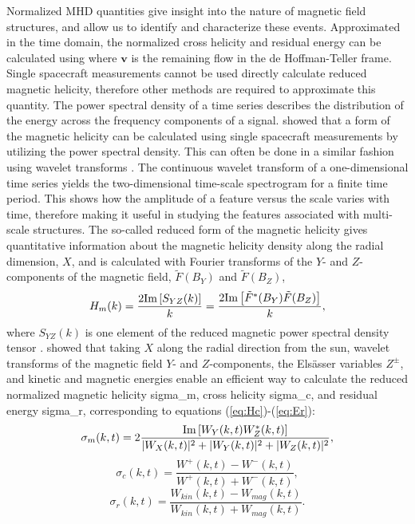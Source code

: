 Normalized MHD quantities give insight into the nature of magnetic field structures, and allow us to identify and characterize these events. Approximated in the time domain, the normalized cross helicity and residual energy can be calculated using
where $\mathbf{v}$ is the remaining flow in the de Hoffman-Teller frame. Single spacecraft measurements cannot be used directly calculate reduced magnetic helicity, therefore other methods are required to approximate this quantity. The power spectral density of a time series describes the distribution of the energy across the frequency components of a signal. \cite{Matthaeus:1982} showed that a form of the magnetic helicity can be calculated using single spacecraft measurements by utilizing the power spectral density. This can often be done in a similar fashion using wavelet transforms \citep{Telloni:2012, Telloni:2013}. The continuous wavelet transform of a one-dimensional time series yields the two-dimensional time-scale spectrogram for a finite time period. This shows how the amplitude of a feature versus the scale varies with time, therefore making it useful in studying the features associated with multi-scale structures. The so-called reduced form of the magnetic helicity gives quantitative information about the magnetic helicity density along the radial dimension, $X$, and is calculated with Fourier transforms of the $Y$- and $Z$-components of the magnetic field, $\tilde F(B_Y)$ and $\tilde F(B_Z)$,
\begin{equation}
    H_m(k) = \frac{2 \textnormal{Im}\left[S_{YZ} (k)\right]}{k} = \frac{2 \textnormal{Im}\left[ \tilde F^*(B_Y)\tilde F(B_Z) \right]}{k},
\end{equation}
where $S_{YZ}(k)$ is one element of the reduced magnetic power spectral density tensor \citep{Matthaeus:1982}. \cite{Telloni:2012} showed that taking $X$ along the radial direction from the sun, wavelet transforms of the magnetic field $Y$- and $Z$-components, the Els\"asser variables $Z^\pm$, and kinetic and magnetic energies enable an efficient way to calculate the reduced normalized magnetic helicity \gls{sigma_m}, cross helicity \gls{sigma_c}, and residual energy \gls{sigma_r}, corresponding to equations (\ref{eq:Hc})-(\ref{eq:Er}):
\begin{equation}
    \sigma_m(k,t) = 2\frac{\textnormal{Im}\left[W_Y(k,t)W_Z^*(k,t)\right]}{|W_X(k,t)|^2 + |W_Y(k,t)|^2 + |W_Z(k,t)|^2} ,
    \label{eq:sigm}
\end{equation}
\begin{equation}
    \sigma_c(k,t) = \frac{W^+(k,t)-W^-(k,t)}{W^+(k,t)+W^-(k,t)} ,
    \label{eq:sigc}
\end{equation}
 \begin{equation}
    \sigma_r(k,t) = \frac{W_{kin}(k,t) - W_{mag}(k,t)}{W_{kin}(k,t) + W_{mag}(k,t)} .
    \label{eq:sigr}
\end{equation}


